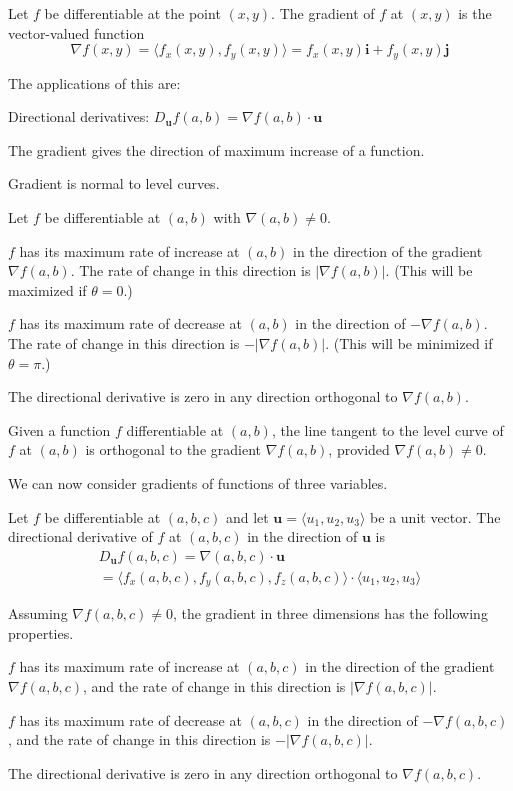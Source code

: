 \documentclass[../calc3.tex]{subfiles}
\begin{document}
\begin{definition}
    Let $f$ be differentiable at the point $(x,y)$. The gradient of $f$ at $(x,y)$ is the vector-valued function 
    \[\nabla f(x,y)=\langle f_x(x,y),f_y(x,y)\rangle = f_x(x,y)\textbf{i}+f_y(x,y)\textbf{j}\]
\end{definition}

The applications of this are:

Directional derivatives: $D_{\textbf{u}}f(a,b)=\nabla f(a,b)\cdot\textbf{u}$

The gradient gives the direction of maximum increase of a function.

Gradient is normal to level curves.

\begin{theorem}
    Let $f$ be differentiable at $(a,b)$ with $\nabla (a,b)\neq 0$.

    $f$ has its maximum rate of increase at $(a,b)$ in the direction of the gradient $\nabla f(a,b)$.
    The rate of change in this direction is $|\nabla f(a,b)|$. (This will be maximized if $\theta = 0$.)

    $f$ has its maximum rate of decrease at $(a,b)$ in the direction of $-\nabla f(a,b)$. 
    The rate of change in this direction is $-|\nabla f(a,b)|$. (This will be minimized if $\theta = \pi$.)

    The directional derivative is zero in any direction orthogonal to $\nabla f(a,b)$.
\end{theorem}

\begin{theorem}
    Given a function $f$ differentiable at $(a,b)$, the line tangent to the level curve of $f$ at $(a,b)$ 
    is orthogonal to the gradient $\nabla f(a,b)$, provided $\nabla f(a,b)\neq 0$.
\end{theorem}

We can now consider gradients of functions of three variables.

\begin{theorem}
    Let $f$ be differentiable at $(a,b,c)$ and let $\textbf{u}=\langle u_1, u_2, u_3 \rangle$ be a unit vector. The 
    directional derivative of $f$ at $(a,b,c)$ in the direction of $\textbf{u}$ is 
    \begin{align*}
        D_{\textbf{u}}f(a,b,c)=\nabla(a,b,c)\cdot\textbf{u}\\
        =\langle f_x(a,b,c),f_y(a,b,c),f_z(a,b,c)\rangle\cdot\langle u_1, u_2, u_3\rangle
    \end{align*}

    Assuming $\nabla f(a,b,c)\neq 0$, the gradient in three dimensions has the following properties.

    $f$ has its maximum rate of increase at $(a,b,c)$ in the direction of the gradient 
    $\nabla f(a,b,c)$, and the rate of change in this direction is $|\nabla f(a,b,c)|$.

    $f$ has its maximum rate of decrease at $(a,b,c)$ in the direction of 
    $-\nabla f(a,b,c)$, and the rate of change in this direction is $-|\nabla f(a,b,c)|$.

    The directional derivative is zero in any direction orthogonal to $\nabla f(a,b,c)$.
\end{theorem}
\end{document}
